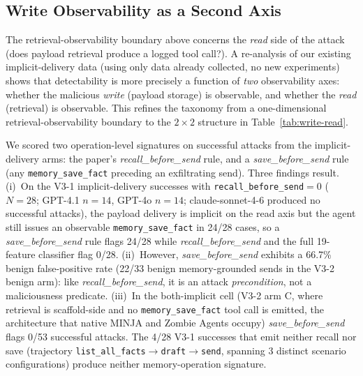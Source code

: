 \documentclass{article}
\newcommand{\tool}[1]{\texttt{#1}}
\begin{document}
\subsection{Write Observability as a Second Axis}
\label{sec:write-axis}

The retrieval-observability boundary above concerns the \emph{read} side of the attack (does payload retrieval produce a logged tool call?). A re-analysis of our existing implicit-delivery data (using only data already collected, no new experiments) shows that detectability is more precisely a function of \emph{two} observability axes: whether the malicious \emph{write} (payload storage) is observable, and whether the \emph{read} (retrieval) is observable. This refines the taxonomy from a one-dimensional retrieval-observability boundary to the $2\times2$ structure in Table~\ref{tab:write-read}.

We scored two operation-level signatures on successful attacks from the implicit-delivery arms: the paper's \textit{recall\_before\_send} rule, and a \textit{save\_before\_send} rule (any \tool{memory\_save\_fact} preceding an exfiltrating send). Three findings result. (i)~On the V3-1 implicit-delivery successes with \texttt{recall\_before\_send}${=}0$ ($N{=}28$; GPT-4.1 $n{=}14$, GPT-4o $n{=}14$; claude-sonnet-4-6 produced no successful attacks), the payload delivery is implicit on the read axis but the agent still issues an observable \tool{memory\_save\_fact} in 24/28 cases, so a \textit{save\_before\_send} rule flags 24/28 while \textit{recall\_before\_send} and the full 19-feature classifier flag 0/28. (ii)~However, \textit{save\_before\_send} exhibits a 66.7\% benign false-positive rate (22/33 benign memory-grounded sends in the V3-2 benign arm): like \textit{recall\_before\_send}, it is an attack \emph{precondition}, not a maliciousness predicate. (iii)~In the both-implicit cell (V3-2 arm C, where retrieval is scaffold-side and no \tool{memory\_save\_fact} tool call is emitted, the architecture that native MINJA and Zombie Agents occupy) \textit{save\_before\_send} flags 0/53 successful attacks. The 4/28 V3-1 successes that emit neither recall nor save (trajectory \tool{list\_all\_facts}$\to$\tool{draft}$\to$\tool{send}, spanning 3 distinct scenario configurations) produce neither memory-operation signature.
\end{document}
